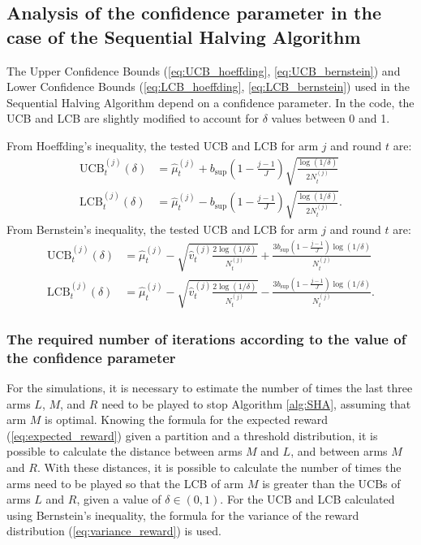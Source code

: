 \documentclass{statsmsc}
\begin{document}
\subsection{Analysis of the confidence parameter in the case of the Sequential Halving Algorithm}

The Upper Confidence Bounds (\ref{eq:UCB_hoeffding}, \ref{eq:UCB_bernstein}) and Lower Confidence Bounds (\ref{eq:LCB_hoeffding}, \ref{eq:LCB_bernstein}) used in the Sequential Halving Algorithm depend on a confidence parameter. In the code, the UCB and LCB are slightly modified to account for $\delta$ values between 0 and 1.

From Hoeffding's inequality, the tested UCB and LCB for arm $j$ and round $t$ are:
\begin{subequations}\label{eq:hoeffding_test}
  \begin{align}
    \text{UCB}^{(j)}_t(\delta) &= \hat{\mu}_t^{(j)} + b_{\sup}\left(1 - \frac{j-1}{J}\right)\sqrt{\frac{\log(1/\delta)}{2 N_t^{(j)}}} \label{eq:UCB_hoeffding_test} \\ 
    \text{LCB}^{(j)}_t(\delta) &= \hat{\mu}_t^{(j)} - b_{\sup}\left(1 - \frac{j-1}{J}\right)\sqrt{\frac{\log(1/\delta)}{2 N_t^{(j)}}} \label{eq:LCB_hoeffding_test}.
  \end{align}
\end{subequations}
From Bernstein's inequality, the tested UCB and LCB for arm $j$ and round $t$ are:
\begin{subequations}\label{eq:bernstein_test}
  \begin{align}
    \text{UCB}^{(j)}_t(\delta)&=\hat{\mu}_t^{(j)} - \sqrt{\hat{v}_t^{(j)}\frac{2\log(1/\delta)}{N_t^{(j)}}} + \frac{3 b_{\sup}\left(1 - \frac{j-1}{J}\right) \log(1/\delta)}{N_t^{(j)}} \label{eq:UCB_bernstein_test} \\ 
    \text{LCB}^{(j)}_t(\delta)&=\hat{\mu}_t^{(j)} - \sqrt{\hat{v}_t^{(j)}\frac{2\log(1/\delta)}{N_t^{(j)}}} - \frac{3 b_{\sup}\left(1 - \frac{j-1}{J}\right) \log(1/\delta)}{N_t^{(j)}} \label{eq:LCB_bernstein_test}.
  \end{align}
\end{subequations}

\subsubsection{The required number of iterations according to the value of the confidence parameter}

For the simulations, it is necessary to estimate the number of times the last three arms $L$, $M$, and $R$ need to be played to stop Algorithm \ref{alg:SHA}, assuming that arm $M$ is optimal. Knowing the formula for the expected reward (\ref{eq:expected_reward}) given a partition and a threshold distribution, it is possible to calculate the distance between arms $M$ and $L$, 
and between arms $M$ and $R$. With these distances, it is possible to calculate the number of times the arms need to be played so that the LCB of arm $M$ is greater than the UCBs of arms $L$ and $R$, given a value of $\delta \in (0,1)$. For the UCB and LCB calculated using Bernstein's inequality, the formula for the variance of the reward distribution (\ref{eq:variance_reward}) is used.
\end{document}

